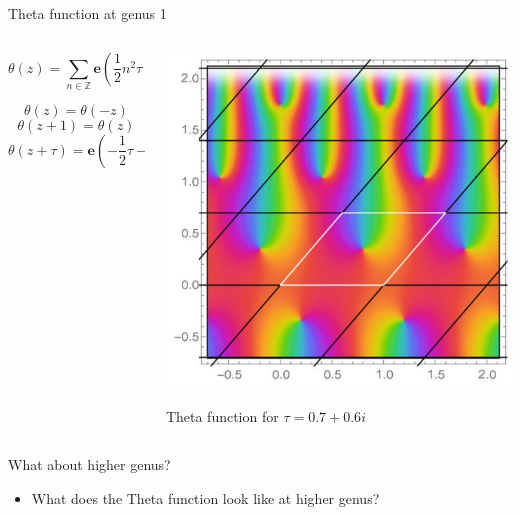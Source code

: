 \documentclass[11pt,aspectratio=169]{beamer}
\newcommand{\ee}[0]{\mathbf{e}}
\begin{document}
\begin{frame}{Theta function at genus 1}
    \begin{columns}[onlytextwidth]
        \begin{column}{0.55\textwidth}
            \[\theta(z) = \sum_{n \in \mathbb Z} \ee\left(\frac{1}{2}n^2 \tau + n z\right)\]

            \[\theta(z)=\theta(-z)\]
            \[\theta(z+1)=\theta(z)\]
            \[\theta(z+\tau)=\ee\left(-\frac{1}{2}\tau-z\right)\theta(z)\]
        \end{column}
        \begin{column}{0.45\textwidth}
            \center{}
            \includegraphics[width=0.7\columnwidth]{assets/genus1theta.png}

            \tiny Theta function for $\tau = 0.7+0.6i$
            
            \cite{Cha22}
        \end{column}
    \end{columns}

    \pause{}

    {
    \begin{block}{What about higher genus?}
        \begin{itemize}
            \item What does the Theta function look like at higher genus?
        \end{itemize}
    \end{block}
    }
\end{frame}
\end{document}
